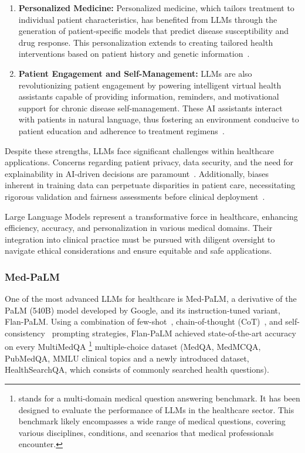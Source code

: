 \begin{enumerate}
    \item \textbf{Personalized Medicine:}{
        Personalized medicine, which tailors treatment to individual patient characteristics, has benefited from LLMs through the generation of patient-specific models that predict disease susceptibility and drug response. This personalization extends to creating tailored health interventions based on patient history and genetic information~\cite{hamburg2010path}.
    }

    \item \textbf{Patient Engagement and Self-Management:}{
        LLMs are also revolutionizing patient engagement by powering intelligent virtual health assistants capable of providing information, reminders, and motivational support for chronic disease self-management. These AI assistants interact with patients in natural language, thus fostering an environment conducive to patient education and adherence to treatment regimens~\cite{kocaballi2019personalization}.
    }
\end{enumerate}

Despite these strengths, LLMs face significant challenges within healthcare applications.
Concerns regarding patient privacy, data security, and the need for explainability in AI-driven decisions are paramount~\cite{beam2018big}.
Additionally, biases inherent in training data can perpetuate disparities in patient care, necessitating rigorous validation and fairness assessments before clinical deployment~\cite{chen2019single}.

Large Language Models represent a transformative force in healthcare, enhancing efficiency, accuracy, and personalization in various medical domains.
Their integration into clinical practice must be pursued with diligent oversight to navigate ethical considerations and ensure equitable and safe applications.

\subsubsection{Med-PaLM}
\label{subsubsec:med-palm}

One of the most advanced LLMs for healthcare is Med-PaLM, a derivative of the PaLM (540B) model developed by Google, and its instruction-tuned variant, Flan-PaLM. Using a combination of few-shot~\cite{gpt3}, chain-of-thought (CoT)~\cite{wei2022chain}, and self-consistency~\cite{wang2022self} prompting strategies, Flan-PaLM achieved state-of-the-art accuracy on every MultiMedQA \footnote{stands for a multi-domain medical question answering benchmark. It has been designed to evaluate the performance of LLMs in the healthcare sector.
This benchmark likely encompasses a wide range of medical questions, covering various disciplines, conditions, and scenarios that medical professionals encounter.} multiple-choice dataset (MedQA, MedMCQA, PubMedQA, MMLU clinical topics and a newly introduced dataset, HealthSearchQA, which consists of commonly searched health questions).

